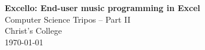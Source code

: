 \pagestyle{empty}


\vspace*{60mm}
\begin{center}
\Huge
\textbf{Excello: End-user music programming in Excel} \\[5mm]
Computer Science Tripos -- Part II \\[5mm]
Christ's College \\[5mm]
\today  %
\end{center}
